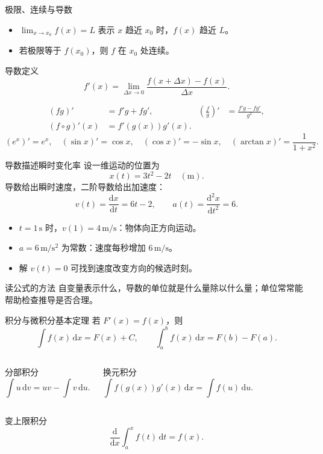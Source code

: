 \begin{frame}{极限、连续与导数}
  \begin{itemize}
    \item $\lim_{x\to x_0}f(x)=L$ 表示 $x$ 趋近 $x_0$ 时，$f(x)$ 趋近 $L$。
    \item 若极限等于 $f(x_0)$，则 $f$ 在 $x_0$ 处连续。
  \end{itemize}
  \begin{block}{导数定义}
    \[
      f'(x)=\lim_{\Delta x\to0}
      \frac{f(x+\Delta x)-f(x)}{\Delta x}.
    \]
  \end{block}
  \begin{align*}
    (fg)'&=f'g+fg', &
    \left(\frac{f}{g}\right)'&=\frac{f'g-fg'}{g^2},\\
    (f\circ g)'(x)&=f'(g(x))g'(x).
  \end{align*}
  \[
    (e^x)'=e^x,\quad (\sin x)'=\cos x,\quad
    (\cos x)'=-\sin x,\quad (\arctan x)'=\frac{1}{1+x^2}.
  \]
\end{frame}

\begin{frame}{导数描述瞬时变化率}
  设一维运动的位置为
  \[
    x(t)=3t^2-2t \quad (\mathrm{m}).
  \]
  导数给出瞬时速度，二阶导数给出加速度：
  \[
    v(t)=\frac{\mathrm{d}x}{\mathrm{d}t}=6t-2,
    \qquad
    a(t)=\frac{\mathrm{d}^2x}{\mathrm{d}t^2}=6.
  \]
  \begin{itemize}
    \item $t=1\,\mathrm{s}$ 时，$v(1)=4\,\mathrm{m/s}$：物体向正方向运动。
    \item $a=6\,\mathrm{m/s^2}$ 为常数：速度每秒增加 $6\,\mathrm{m/s}$。
    \item 解 $v(t)=0$ 可找到速度改变方向的候选时刻。
  \end{itemize}
  \begin{alertblock}{读公式的方法}
    自变量表示什么，导数的单位就是什么量除以什么量；单位常常能帮助检查推导是否合理。
  \end{alertblock}
\end{frame}

\begin{frame}{积分与微积分基本定理}
  若 $F'(x)=f(x)$，则
  \[
    \int f(x)\,\mathrm{d}x=F(x)+C,
    \qquad
    \int_a^b f(x)\,\mathrm{d}x=F(b)-F(a).
  \]
  \begin{columns}[T]
    \begin{block}{分部积分}
      \[
        \int u\,\mathrm{d}v=uv-\int v\,\mathrm{d}u.
      \]
    \end{block}
    \begin{block}{换元积分}
      \[
        \int f(g(x))g'(x)\,\mathrm{d}x
        =\int f(u)\,\mathrm{d}u.
      \]
    \end{block}
  \end{columns}
  \begin{alertblock}{变上限积分}
    \[
      \frac{\mathrm{d}}{\mathrm{d}x}\int_a^x f(t)\,\mathrm{d}t=f(x).
    \]
  \end{alertblock}
\end{frame}

